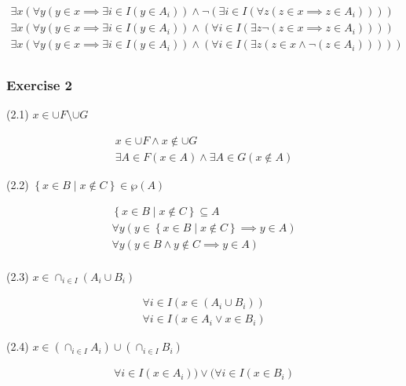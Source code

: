 \begin{solution}
\begin{enumerate}[label=(\alph*)]
{\begin{align*}
        \exists x( \forall y (y \in x \implies \exists i \in I(y \in A_i))
        \land \neg (\exists i \in I(\forall z (z \in x \implies z \in A_i)))) \\
        \exists x( \forall y (y \in x \implies \exists i \in I(y \in A_i))
        \land (\forall i \in I(\exists z \neg(z \in x \implies z \in A_i)))) \\
        \exists x( \forall y (y \in x \implies \exists i \in I(y \in A_i))
        \land (\forall i \in I(\exists z (z \in x \land \neg(z \in A_i))))) \\
        \end{align*}
    }
    \end{enumerate}
\end{solution}

\subsubsection{Exercise 2}
\begin{center}
(2.1) $x \in \cup F \setminus \cup G $
\end{center}
\begin{align*}
x \in \cup F \land x \notin \cup G \\
\exists A \in F(x \in A) \land \exists A \in G(x \notin A)
\end{align*}

\begin{center}
(2.2) $\left\{ x \in B \mid x \notin C\right\} \in \wp(A)$ 
\end{center}
\begin{align*}
\left\{ x \in B \mid x \notin C\right\} \subseteq A  \\
\forall y(y \in \left\{ x \in B \mid x \notin C\right\} \implies y \in A) \\
\forall y(y \in  B \land y \notin C \implies y \in A) \\
\end{align*}

\begin{center}
(2.3) $ x \in \cap_{i \in I}(A_i \cup B_i)$ 
\end{center}
\begin{align*}
\forall i \in I(x \in (A_i \cup B_i)) \\
\forall i \in I(x \in A_i \lor x \in B_i)
\end{align*}

\begin{center}
(2.4) $x \in (\cap_{i \in I}A_i) \cup (\cap_{i \in I}B_i)$ 
\end{center}
\begin{align*}
\forall i \in I(x \in A_i)) \lor (\forall i \in I(x \in B_i)
\end{align*}

